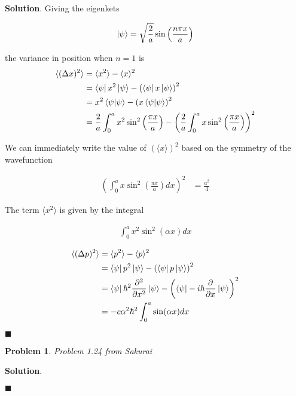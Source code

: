 \documentclass[12pt]{article}
\newtheorem{p}{Problem}
\theoremstyle{definition}
\newenvironment{s}{%
        \begin{trivlist} \item \textbf{Solution}. }{%
            \hspace*{\fill} $\blacksquare$\end{trivlist}}%
\begin{document}
{\begin{s}
Giving the eigenkets 

\begin{align*}
\ket{\psi} = \sqrt{\frac{2}{a}}\sin\left(\frac{n\pi x}{a}\right)
\end{align*}


the variance in position when $n=1$ is
\begin{align*}
\langle (\Delta x)^{2}\rangle &= \langle x^{2} \rangle - \langle x\rangle^{2}\\
&= \bra{\psi} x^{2} \ket{\psi} - \left(\bra{\psi} x \ket{\psi}\right)^{2}\\
&= x^{2}\bra{\psi}\ket{\psi} - \left(x\bra{\psi}\ket{\psi}\right)^{2}\\
&= \frac{2}{a}\int_{0}^{a} x^{2} \sin^{2}\left(\frac{\pi x}{a}\right) - \left(\frac{2}{a}\int_{0}^{a} x \sin^{2}\left(\frac{\pi x}{a}\right)\right)^{2}
\end{align*}

We can immediately write the value of $\left(\langle x \rangle\right)^{2}$ based on the symmetry of the wavefunction

\begin{align*}
\left(\int_{0}^{a} x \sin^{2}\left(\frac{\pi x}{a}\right)dx\right)^{2} &= \frac{a^{2}}{4}
\end{align*}

The term $\langle x^{2} \rangle$ is given by the integral

\begin{align*}
\int_{0}^{a} x^{2} \sin^{2}\left(\alpha x\right)dx 
\end{align*}

\begin{align*}
\langle (\Delta p)^{2}\rangle &= \langle p^{2} \rangle - \langle p\rangle^{2}\\
&= \bra{\psi} p^{2} \ket{\psi} - \left(\bra{\psi} p \ket{\psi}\right)^{2}\\
&= \bra{\psi} \hbar^{2}\frac{\partial^{2}}{\partial x^{2}} \ket{\psi} - \left(\bra{\psi} -i\hbar\frac{\partial}{\partial x} \ket{\psi}\right)^{2}\\
&= -c\alpha^{2}\hbar^{2}\int_{0}^{a} \sin(\alpha x)dx
\end{align*}

\end{s}

\begin{p}
Problem 1.24 from Sakurai
\end{p}

\begin{s} 

\end{s}
\end{document}
